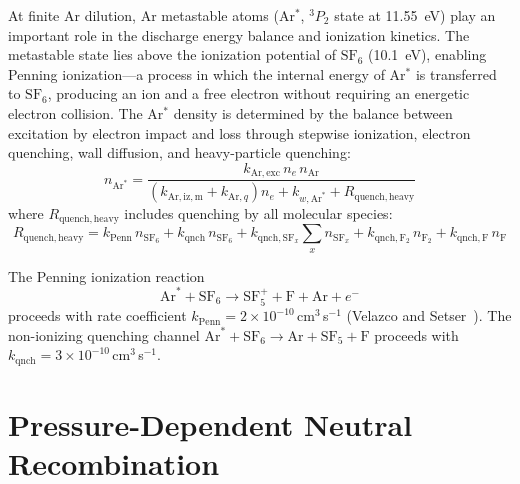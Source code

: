 \documentclass[11pt,a4paper]{report}
\newcommand{\SFx}{\mathrm{SF}_x}
\newcommand{\SFsix}{\mathrm{SF}_6}
\newcommand{\SFfive}{\mathrm{SF}_5}
\newcommand{\Ar}{\mathrm{Ar}}
\begin{document}
At finite Ar dilution, Ar metastable atoms (Ar$^*$, ${}^3P_2$ state at \SI{11.55}{\electronvolt}) play an important role in the discharge energy balance and ionization kinetics.  The metastable state lies above the ionization potential of $\SFsix$ (\SI{10.1}{\electronvolt}), enabling Penning ionization---a process in which the internal energy of Ar$^*$ is transferred to $\SFsix$, producing an ion and a free electron without requiring an energetic electron collision.  The Ar$^*$ density is determined by the balance between excitation by electron impact and loss through stepwise ionization, electron quenching, wall diffusion, and heavy-particle quenching:
\begin{equation}
n_{\Ar^*} = \frac{k_{\Ar,\mathrm{exc}}\, n_e\, n_\Ar}{(k_{\Ar,\mathrm{iz,m}} + k_{\Ar,q})n_e + k_{w,\Ar^*} + R_\mathrm{quench,heavy}}
\label{eq:gas_Arstar}
\end{equation}
where $R_\mathrm{quench,heavy}$ includes quenching by all molecular species:
\begin{equation}
R_\mathrm{quench,heavy} = k_\mathrm{Penn}\, n_{\SFsix} + k_\mathrm{qnch}\, n_{\SFsix} + k_{\mathrm{qnch},\SFx} \sum_x n_{\SFx} + k_{\mathrm{qnch},\mathrm{F}_2}\, n_{\mathrm{F}_2} + k_{\mathrm{qnch},\mathrm{F}}\, n_\mathrm{F}
\label{eq:gas_Rquench}
\end{equation}

The Penning ionization reaction
\begin{equation}
\Ar^* + \SFsix \to \SFfive^+ + \mathrm{F} + \Ar + e^-
\label{eq:gas_penning_rxn}
\end{equation}
proceeds with rate coefficient $k_\mathrm{Penn} = 2 \times 10^{-10}$\,cm$^3$\,s$^{-1}$ (Velazco and Setser~\cite{Velazco1978}).  The non-ionizing quenching channel $\Ar^* + \SFsix \to \Ar + \SFfive + \mathrm{F}$ proceeds with $k_\mathrm{qnch} = 3 \times 10^{-10}$\,cm$^3$\,s$^{-1}$.

\section{Pressure-Dependent Neutral Recombination}
\label{sec:gasphase_troe}
\end{document}
